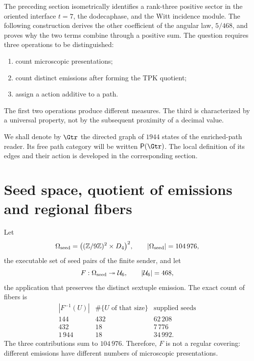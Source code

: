 \label{p3-20260826:chap:medida-accion-positiva}

The preceding section isometrically identifies a rank-three positive sector in the oriented interface \(t=7\), the dodecaphase, and the Witt incidence module. The following construction derives the other coefficient of the angular law, \(5/468\), and proves why the two terms combine through a positive sum. The question requires three operations to be distinguished:
\begin{enumerate}
  \item count microscopic presentations;
  \item count distinct emissions after forming the TPK quotient;
  \item assign a action additive to a path.
\end{enumerate}
The first two operations produce different measures. The third is
characterized by a universal property, not by the subsequent proximity of
a decimal value.

We shall denote by \(\Gtr\) the directed graph of \(1944\) states of the
enriched-path reader. Its free path category will be written
\(\mathsf P(\Gtr)\). The local definition of its edges and their action is
developed in the corresponding section.

\section{Seed space, quotient of emissions and regional fibers}

Let
\[
 \Omega_{\rm seed}
 =\bigl((\mathbb Z/9\mathbb Z)^2\times D_4\bigr)^2,
 \qquad
 |\Omega_{\rm seed}|=104\,976,
\]
the executable set of seed pairs of the finite sender, and let
\[
 F:\Omega_{\rm seed}\twoheadrightarrow\mathcal U_6,
 \qquad
 |\mathcal U_6|=468,
\]
the application that preserves the distinct sextuple emission. The exact count of
fibers is
\[
\begin{array}{c|c|c}
|F^{-1}(U)|&\#\{U\text{ of that size}\}&\text{supplied seeds}\\
\hline
144&432&62\,208\\
432&18&7\,776\\
1\,944&18&34\,992.
\end{array}
\]
The three contributions sum to \(104\,976\). Therefore, \(F\) is not a
regular covering: different emissions have different numbers of
microscopic presentations.


